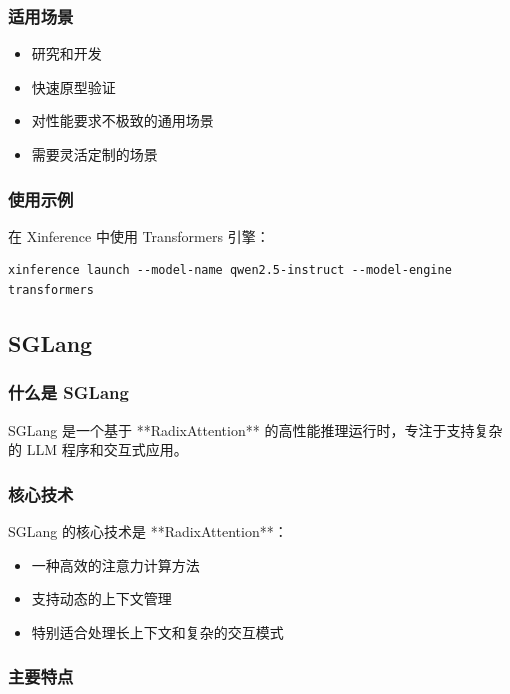 \documentclass[12pt,UTF8]{ctexbook}
\begin{document}
\subsubsection{适用场景}

\begin{itemize}[leftmargin=2cm]
    \item 研究和开发
    \item 快速原型验证
    \item 对性能要求不极致的通用场景
    \item 需要灵活定制的场景
\end{itemize}

\subsubsection{使用示例}

在 Xinference 中使用 Transformers 引擎：

\begin{lstlisting}
xinference launch --model-name qwen2.5-instruct --model-engine transformers
\end{lstlisting}

\subsection{SGLang}
\label{subsec:sglang}

\subsubsection{什么是 SGLang}

SGLang 是一个基于 **RadixAttention** 的高性能推理运行时，专注于支持复杂的 LLM 程序和交互式应用。

\subsubsection{核心技术}

SGLang 的核心技术是 **RadixAttention**：

\begin{itemize}[leftmargin=2cm]
    \item 一种高效的注意力计算方法
    \item 支持动态的上下文管理
    \item 特别适合处理长上下文和复杂的交互模式
\end{itemize}

\subsubsection{主要特点}
\end{document}
